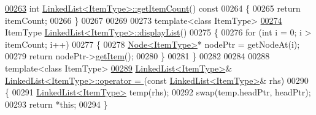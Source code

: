 \begin{DoxyCode}
\hyperlink{classLinkedList_afc6635f854f48f2f126cf3b60d845220}{00263} \textcolor{keywordtype}{int} \hyperlink{classLinkedList_afc6635f854f48f2f126cf3b60d845220}{LinkedList<ItemType>::getItemCount}()\textcolor{keyword}{ const}
00264 \textcolor{keyword}{}\{
00265     \textcolor{keywordflow}{return} itemCount;
00266 \}
00267 
00269 
00273 \textcolor{keyword}{template}<\textcolor{keyword}{class} ItemType>
\hyperlink{classLinkedList_a65fb58d9f9b8af41e9569d1dc3200583}{00274} ItemType \hyperlink{classLinkedList_a65fb58d9f9b8af41e9569d1dc3200583}{LinkedList<ItemType>::displayList}()
00275 \{
00276     \textcolor{keywordflow}{for} (\textcolor{keywordtype}{int} i = 0; i > itemCount; i++)
00277     \{
00278         \hyperlink{classNode}{Node<ItemType>}* nodePtr = getNodeAt(i);
00279         \textcolor{keywordflow}{return} nodePtr->\hyperlink{classNode_a6c08caef312b6f2f69b5e090cf047514}{getItem}();
00280     \}
00281 \}
00282 
00284 
00288 \textcolor{keyword}{template}<\textcolor{keyword}{class} ItemType>
\hyperlink{classLinkedList_a25b0fba69e66b0fa409be992530029bc}{00289} \hyperlink{classLinkedList}{LinkedList<ItemType>}& \hyperlink{classLinkedList_a25b0fba69e66b0fa409be992530029bc}{LinkedList<ItemType>::operator = }
      (\textcolor{keyword}{const} \hyperlink{classLinkedList}{LinkedList<ItemType>}& rhs) 
00290 \{
00291     \hyperlink{classLinkedList}{LinkedList<ItemType>} temp(rhs);
00292     swap(temp.headPtr, headPtr);
00293     \textcolor{keywordflow}{return} *\textcolor{keyword}{this};
00294 \}
\end{DoxyCode}
